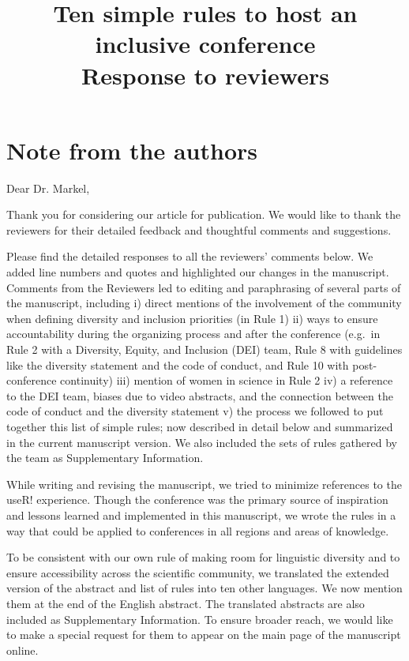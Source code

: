 \documentclass{article}
\title{Ten simple rules to host an inclusive conference\\ \vspace{0.5cm}
\textbf{Response to reviewers}}
\author{}
\date{}
\begin{document}
\maketitle

\section*{Note from the authors}

Dear Dr. Markel, 

Thank you for considering our article for publication. We would like to thank the reviewers for their detailed feedback and thoughtful comments and suggestions.

Please find the detailed responses to all the reviewers' comments below. We added line numbers and quotes and highlighted our changes in the manuscript. 
Comments from the Reviewers led to editing and paraphrasing of several parts of the manuscript, including
i) direct mentions of the involvement of the community when defining diversity and inclusion priorities (in Rule 1)
ii) ways to ensure accountability during the organizing process and after the conference (e.g.\ in Rule 2 with a Diversity, Equity, and Inclusion (DEI) team, Rule 8 with guidelines like the diversity statement and the code of conduct, and Rule 10 with post-conference continuity)
iii) mention of women in science in Rule 2
iv) a reference to the DEI team, biases due to video abstracts, and the connection between the code of conduct and the diversity statement
v) the process we followed to put together this list of simple rules; now described in detail below and summarized in the current manuscript version. We also included the sets of rules gathered by the team as Supplementary Information. 

While writing and revising the manuscript, we tried to minimize references to the useR! experience. Though the conference was the primary source of inspiration and lessons learned and implemented in this manuscript, we wrote the rules in a way that could be applied to conferences in all regions and areas of knowledge. 

To be consistent with our own rule of making room for linguistic diversity and to ensure accessibility across the scientific community, we translated the extended version of the abstract and list of rules into ten other languages. We now mention them at the end of the English abstract. The translated abstracts are also included as Supplementary Information. To ensure broader reach, we would like to make a special request for them to appear on the main page of the manuscript online.
\end{document}
